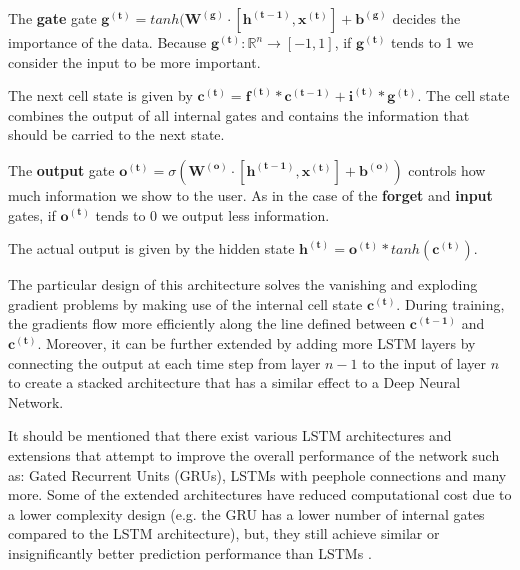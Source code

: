 The \textbf{gate} gate $\boldsymbol{g^{(t)}} = tanh(\boldsymbol{W^{(g)}} \cdot [\boldsymbol{h^{(t - 1)}}, \boldsymbol{x^{(t)}}] + \boldsymbol{b^{(g)}}$ decides the importance of the data. Because $\boldsymbol{g^{(t)}}\colon \mathbb{R}^n \xrightarrow{} [-1, 1]$, if $\boldsymbol{g^{(t)}}$ tends to 1 we consider the input to be more important.

The next cell state is given by $\boldsymbol{c^{(t)}} = \boldsymbol{f^{(t)}} * \boldsymbol{c^{(t - 1)}} + \boldsymbol{i^{(t)}} * \boldsymbol{g^{(t)}}$. The cell state combines the output of all internal gates and contains the information that should be carried to the next state.

The \textbf{output} gate $\boldsymbol{o^{(t)}} = \sigma(\boldsymbol{W^{(o)}} \cdot [\boldsymbol{h^{(t - 1)}}, \boldsymbol{x^{(t)}}] + \boldsymbol{b^{(o)}})$ controls how much information we show to the user. As in the case of the \textbf{forget} and \textbf{input} gates, if $\boldsymbol{o^{(t)}}$ tends to 0 we output less information.

The actual output is given by the hidden state $\boldsymbol{h^{(t)}} = \boldsymbol{o^{(t)}} * tanh(\boldsymbol{c^{(t)}})$.

The particular design of this architecture solves the vanishing and exploding gradient problems by making use of the internal cell state $\boldsymbol{c^{(t)}}$. During training, the gradients flow more efficiently along the line defined between $\boldsymbol{c^{(t - 1)}}$  and $\boldsymbol{c^{(t)}}$. Moreover, it can be further extended by adding more LSTM layers by connecting the output at each time step from layer $n - 1$ to the input of layer $n$ to create a stacked architecture that has a similar effect to a Deep Neural Network.

It should be mentioned that there exist various LSTM architectures and extensions that attempt to improve the overall performance of the network such as: Gated Recurrent Units (GRUs), LSTMs with peephole connections and many more. Some of the extended architectures have reduced computational cost due to a lower complexity design (e.g. the GRU has a lower number of internal gates compared to the LSTM architecture), but, they still achieve similar or insignificantly better prediction performance than LSTMs \cite{ml, russell2016artificial, Goodfellow-et-al-2016, hochreiter1997long, LSTM_blog}.